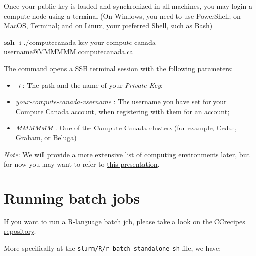 \documentclass[
]{book}
\newenvironment{Shaded}{\begin{snugshade}}{\end{snugshade}}
\newcommand{\AttributeTok}[1]{\textcolor[rgb]{0.13,0.29,0.53}{#1}}
\newcommand{\FunctionTok}[1]{\textcolor[rgb]{0.13,0.29,0.53}{\textbf{#1}}}
\newcommand{\NormalTok}[1]{#1}
\providecommand{\tightlist}{%
  \setlength{\itemsep}{0pt}\setlength{\parskip}{0pt}}
\begin{document}
Once your public key is loaded and synchronized in all machines, you may login a compute node using a terminal (On Windows, you need to use PowerShell; on MacOS, Terminal; and on Linux, your preferred Shell, such as Bash):

\begin{Shaded}
\begin{Highlighting}[]
\FunctionTok{ssh} \AttributeTok{{-}i}\NormalTok{ ./computecanada{-}key your{-}compute{-}canada{-}username@MMMMMM.computecanada.ca}
\end{Highlighting}
\end{Shaded}

The command opens a SSH terminal session with the following parameters:

\begin{itemize}
\tightlist
\item
  \emph{-i} : The path and the name of your \emph{Private Key};
\item
  \emph{your-compute-canada-username} : The username you have set for your Compute Canada account, when registering with them for an account;
\item
  \emph{MMMMMM} : One of the Compute Canada clusters (for example, Cedar, Graham, or Beluga)
\end{itemize}

\emph{Note}: We will provide a more extensive list of computing environments later, but for now you may want to refer to \href{http://bit.ly/introhpc}{this presentation}.

\hypertarget{running-batch-jobs}{%
\section{Running batch jobs}\label{running-batch-jobs}}

If you want to run a R-language batch job, please take a look on the
\href{https://github.com/ricardobarroslourenco/CCrecipes}{CCrecipes repository}.

More specifically at the \texttt{slurm/R/r\_batch\_standalone.sh} file, we have:
\end{document}
